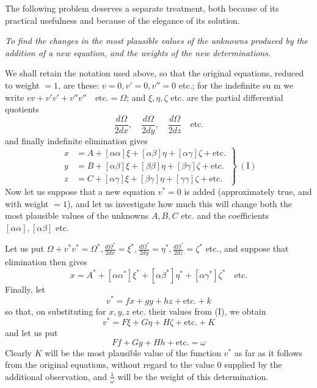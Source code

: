 The following problem deserves a separate treatment, both because of its practical usefulness and because of the elegance of its solution.

\textit{To find the changes in the most plausible values of the unknowns produced by the addition of a new equation, and the weights of the new determinations.}

We shall retain the notation used above, so that the original equations, reduced to weight \(=1\), are these: \(v=0,\allowbreak v'=0,\allowbreak v''=0\) etc.; for the indefinite su%
m we write \(vv+v'v'+v''v''\quad\text{etc.}=\Omega\); and \(\xi,\eta,\zeta\) etc. are the partial differential quotients
\[
\frac{d\Omega}{2dx},\quad\frac{d\Omega}{2dy},\quad\frac{d\Omega}{2dz}\quad\text{etc.}
\]
and finally indefinite elimination gives
\[
\left.\begin{aligned}
x&=A+[\alpha\alpha]\xi+[\alpha\beta]\eta+[\alpha\gamma]\zeta+\text{etc.}\\
y&=B+[\alpha\beta]\xi+[\beta\beta]\eta+[\beta\gamma]\zeta+\text{etc.}\\
z&=C+[\alpha\gamma]\xi+[\beta\gamma]\eta+[\gamma\gamma]\zeta+\text{etc.}
\end{aligned}\right\}\ (\mathrm{I})
\]
Now let us suppose that a new equation \(v^*=0\) is added (approximately true, and with weight \(=1\)), and let us investigate how much this will change both the most plausible values of the unknowns \(A,B,C\) etc. and the coefficients \([\alpha\alpha],[\alpha\beta]\) etc.

Let us put \(\Omega+v^*v^*=\Omega^*,\allowbreak\frac{d\Omega^*}{2dx}=\xi^*,\allowbreak\frac{d\Omega^*}{2dy}=\eta^*,\allowbreak\frac{d\Omega^*}{2dz}=\zeta^*\) etc., and suppose that elimination then gives
\[
x=A^*+[\alpha\alpha^*]\xi^*+[\alpha\beta^*]\eta^*+[\alpha\gamma^*]\zeta^*\quad\text{etc.}
\]
Finally, let
\[
v^*=fx+gy+hz+\text{etc.}+k
\]
so that, on substituting for \(x,y,z\) etc. their values from (I), we obtain
\[
v^*=F\xi+G\eta+H\zeta+\text{etc.}+K
\]
and let us put
\[
Ff+Gg+Hh+\text{etc.}=\omega
\]
Clearly \(K\) will be the most plausible value of the function \(v^*\) as far as it follows from the original equations, without regard to the value \(0\) supplied by the additional observation, and \(\frac1\omega\) will be the weight of this determination.


